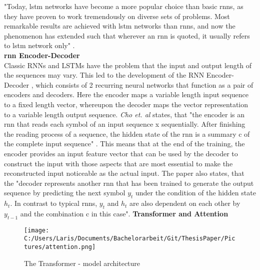 \documentclass[a4paper, 11pt,titlepage,oneside,openany]{book}
\begin{document}
\noindent "Today, \gls{lstm} networks have become a more popular choice than basic \gls{rnn}s, as they have proven to work tremendously on diverse sets of problems. Most remarkable results are achieved with \gls{lstm} networks than \gls{rnn}s, and now the phenomenon has extended such that wherever an \gls{rnn} is quoted, it usually refers to \gls{lstm} network only" \cite{rnn}.\\

\noindent \textbf{\gls{rnn} Encoder-Decoder} \\
\noindent Classic RNNs and LSTMs have the problem that the input and output length of the sequences may vary. This led to the development of the RNN Encoder-Decoder \cite{encodedecode}, which consists of 2 recurring neural networks that function as a pair of encoders and decoders. Here the encoder maps a variable length input sequence to a fixed length vector, whereupon the decoder maps the vector representation to a variable length output sequence. \textit{Cho et. al} states, that "the encoder is an \gls{rnn} that reads each symbol of an input sequence x sequentially. After finishing the reading process of a sequence, the hidden state of the \gls{rnn} is a summary c of the complete input sequence" \cite{encodedecode}. This means that at the end of the training, the encoder provides an input feature vector that can be used by the decoder to construct the input with those aspects that are most essential to make the reconstructed input noticeable as the actual input. The paper also states, that the "decoder represents another \gls{rnn} that has been trained to generate the output sequence by predicting the next symbol $y_t$ under the condition of the hidden state $h_t$. In contrast to typical \gls{rnn}s, $y_t$ and $h_t$ are also dependent on each other by $y_{t-1}$ and the combination c in this case". 
\newpage
\noindent \textbf{Transformer and Attention} \\
\begin{figure}[h]
	\centering
	\texttt{[image: C:/Users/Laris/Documents/Bachelorarbeit/Git/ThesisPaper/Pictures/attention.png]}
	\caption{The Transformer - model architecture \cite{attention}}
\end{figure}\\
\end{document}
